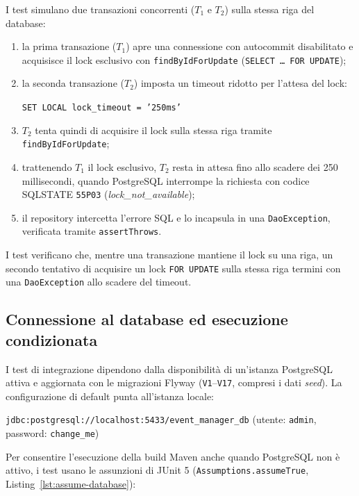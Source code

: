 I test simulano due transazioni concorrenti ($T_1$ e $T_2$) sulla stessa riga del database:
\begin{enumerate}
  \item la prima transazione ($T_1$) apre una connessione con autocommit disabilitato e acquisisce il lock esclusivo con \texttt{findByIdForUpdate} (\texttt{SELECT \dots\ FOR UPDATE});
  \item la seconda transazione ($T_2$) imposta un timeout ridotto per l'attesa del lock:
  \begin{center}
  \texttt{SET LOCAL lock\_timeout = '250ms'}
  \end{center}
  \item $T_2$ tenta quindi di acquisire il lock sulla stessa riga tramite \texttt{findByIdForUpdate};
  \item trattenendo $T_1$ il lock esclusivo, $T_2$ resta in attesa fino allo scadere dei 250 millisecondi, quando PostgreSQL interrompe la richiesta con codice SQLSTATE \texttt{55P03} (\textit{lock\_not\_available});
  \item il repository intercetta l'errore SQL e lo incapsula in una \texttt{DaoException}, verificata tramite \texttt{assertThrows}.
\end{enumerate}

I test verificano che, mentre una transazione mantiene il lock
su una riga, un secondo tentativo di acquisire un lock
\texttt{FOR UPDATE} sulla stessa riga termini con una
\texttt{DaoException} allo scadere del timeout.

\subsection{Connessione al database ed esecuzione condizionata}
\label{sec:connessione-esecuzione-condizionata}
I test di integrazione dipendono dalla disponibilità di un'istanza PostgreSQL attiva e aggiornata con le migrazioni Flyway (\texttt{V1}--\texttt{V17}, compresi i dati \textit{seed}).
La configurazione di default punta all'istanza locale:
\begin{center}
\texttt{jdbc:postgresql://localhost:5433/event\_manager\_db} \quad (utente: \texttt{admin}, password: \texttt{change\_me})
\end{center}

Per consentire l'esecuzione della build Maven anche quando PostgreSQL non è attivo, i test usano le assunzioni di JUnit 5 (\texttt{Assumptions.assumeTrue}, Listing~\ref{lst:assume-database}):

